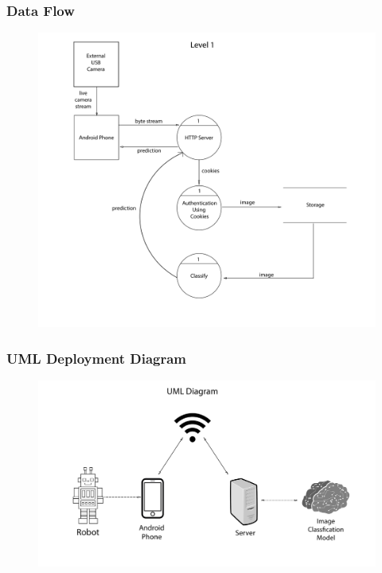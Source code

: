 \documentclass{beamer}
\begin{document}
\begin{frame}
	\frametitle{Data Flow}
	\begin{figure}
		\begin{center}
			\includegraphics[scale=.21]{level_1_dia.jpg}
		\end{center}
	\end{figure}
\end{frame}

\begin{frame}
	\frametitle{UML Deployment Diagram}
	\begin{figure}
		\begin{center}
			\includegraphics[scale=.3]{uml_dia.jpg}
		\end{center}
	\end{figure}
\end{frame}
\end{document}
